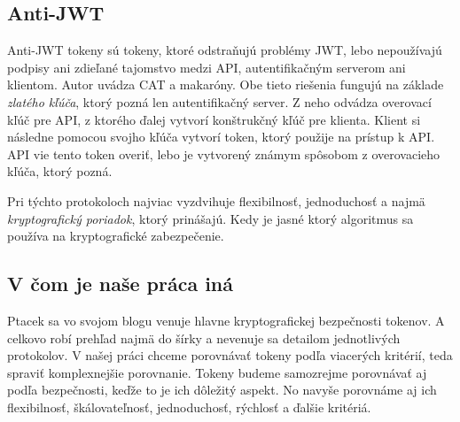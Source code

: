 \subsection{Anti-JWT}

Anti-JWT tokeny sú tokeny, ktoré odstraňujú problémy JWT, lebo nepoužívajú podpisy ani zdieľané tajomstvo medzi API, autentifikačným serverom ani klientom. Autor uvádza CAT a makaróny. Obe tieto riešenia fungujú na základe \textit{zlatého kľúča}, ktorý pozná len autentifikačný server. Z neho odvádza overovací kľúč pre API, z ktorého ďalej vytvorí konštrukčný kľúč pre klienta. Klient si následne pomocou svojho kľúča vytvorí token, ktorý použije na prístup k API. API vie tento token overiť, lebo je vytvorený známym spôsobom z overovacieho kľúča, ktorý pozná.

Pri týchto protokoloch najviac vyzdvihuje flexibilnosť, jednoduchosť a najmä \textit{kryptografický poriadok}, ktorý prinášajú. Kedy je jasné ktorý algoritmus sa používa na kryptografické zabezpečenie.

\subsection{V čom je naše práca iná}

Ptacek sa vo svojom blogu venuje hlavne kryptografickej bezpečnosti tokenov. A celkovo robí prehľad najmä do šírky a nevenuje sa detailom jednotlivých protokolov. V našej práci chceme porovnávať tokeny podľa viacerých kritérií, teda spraviť komplexnejšie porovnanie. Tokeny budeme samozrejme porovnávať aj podľa bezpečnosti, keďže to je ich dôležitý aspekt. No navyše porovnáme aj ich flexibilnosť, škálovateľnosť, jednoduchosť, rýchlosť a ďalšie kritériá.